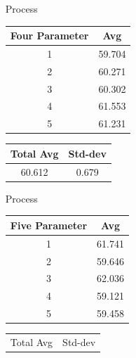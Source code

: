 \begin{enumerate}
\begin{center}
\begin{tabular}{||c c||}
                 \hline
                \hline
            \end{tabular}
        \end{center}
        \item [Process]
        \begin{center}
            \begin{tabular}{||c c||} 
             \hline
             Four Parameter & Avg \\ [0.5ex] 
             \hline\hline
             1 & 59.704  \\ 
             \hline
             2 & 60.271  \\ 
             \hline
             3 & 60.302  \\ 
             \hline
             4 & 61.553 \\ 
             \hline
             5 & 61.231  \\ 
             \hline
             \hline
            \end{tabular}
                                        \begin{tabular}{||c c||} 
                 \hline
                 Total Avg & Std-dev \\ [0.5ex] 
                 \hline\hline
                 60.612 & 0.679\\ 
                 \hline
                \hline
            \end{tabular}
        \end{center}
        \item [Process]
        \begin{center}
            \begin{tabular}{||c c||} 
             \hline
             Five Parameter & Avg \\ [0.5ex] 
             \hline\hline
             1 & 61.741  \\ 
             \hline
             2 & 59.646  \\ 
             \hline
             3 & 62.036  \\ 
             \hline
             4 & 59.121 \\ 
             \hline
             5 & 59.458  \\ 
             \hline
             \hline
            \end{tabular}
                                        \begin{tabular}{||c c||} 
                 \hline
                 Total Avg & Std-dev \\ [0.5ex] 

\end{tabular}
\end{center}
\end{enumerate}
